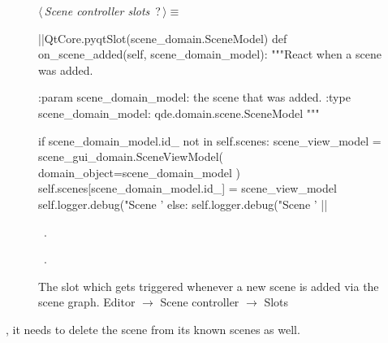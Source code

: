 \documentclass[%
    a4paper,    %
    justified,  %
    nobib,      %
    openany     %
]{tufte-book}
\makeatletter
\renewcommand{\label}[1]{\@tufte@label{##1}}%
\makeatother
\begin{document}
\begin{figure}
\begin{flushleft} \small
\begin{minipage}{\linewidth}\label{scrap93}\raggedright\small
{} $\langle\,${\itshape Scene controller slots}\nobreak\ {\footnotesize {?}}$\,\rangle\equiv$
\vspace{-1ex}
\begin{pythoncode}
|\normalfont{}\fontfamily{}|QtCore.pyqtSlot(scene_domain.SceneModel)
def on_scene_added(self, scene_domain_model):
    """React when a scene was added.

    :param scene_domain_model: the scene that was added.
    :type scene_domain_model:  qde.domain.scene.SceneModel
    """

    if scene_domain_model.id_ not in self.scenes:
        scene_view_model = scene_gui_domain.SceneViewModel(
            domain_object=scene_domain_model
        )
        self.scenes[scene_domain_model.id_] = scene_view_model
        self.logger.debug("Scene '%
    else:
        self.logger.debug("Scene '%
|\NWsep|
\end{pythoncode}
\vspace{1.5ex}
\footnotesize
\begin{list}{}{\setlength{\itemsep}{-\parsep}\setlength{\itemindent}{-\leftmargin}}
\item \NWtxtMacroDefBy\ .
\item \NWtxtMacroRefIn\ .

\item{}
\end{list}
\end{minipage}\vspace{4ex}
\end{flushleft}
\caption{The slot which gets triggered whenever a new scene is added via the
  scene graph.
  \newline{}\newline{}Editor $\rightarrow$ Scene controller $\rightarrow$
  Slots}
\label{editor:lst:scene-controller:slots:on-scene-added}
\end{figure}

, it needs to delete the scene from its
known scenes as well.
\end{document}
